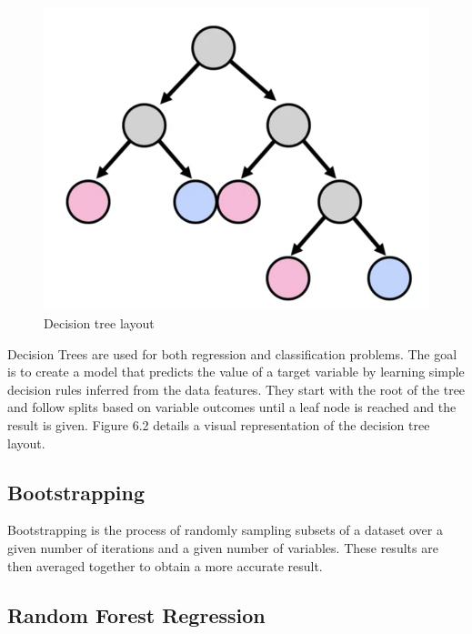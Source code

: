 \begin{figure}[h]
\centering
\includegraphics[width=1\textwidth]{./figures/dectree.png}
\caption{Decision tree layout}
\label{fig1}
\end{figure}

Decision Trees are used for both regression and classification problems. The goal is to create a model that predicts the value of a target variable by learning simple decision rules inferred from the data features. They start with the root of the tree and follow splits based on variable outcomes until a leaf node is reached and the result is given. Figure 6.2 details a visual representation of the decision tree layout. 

\subsection{Bootstrapping}

Bootstrapping is the process of randomly sampling subsets of a dataset over a given number of iterations and a given number of variables. These results are then averaged together to obtain a more accurate result. 

\subsection{Random Forest Regression}

